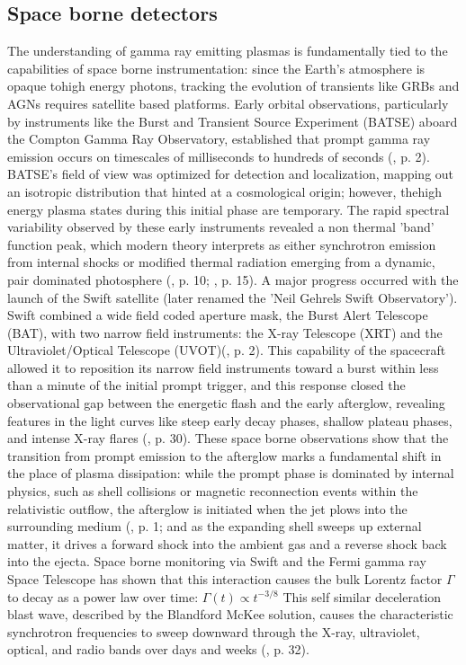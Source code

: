 \documentclass{aa} %
\begin{document}
\subsection{Space borne detectors}
The understanding of gamma ray emitting plasmas is fundamentally tied to the capabilities of space borne instrumentation: since the Earth's atmosphere is opaque tohigh energy photons, tracking the evolution of transients like GRBs and AGNs requires satellite based platforms. 
Early orbital observations, particularly by instruments like the Burst and Transient Source Experiment (BATSE) aboard the Compton Gamma Ray Observatory, established that prompt gamma ray emission occurs on timescales of milliseconds to hundreds of seconds (\citet{KumarandZhang2015}, p. 2). BATSE’s field of view was optimized for detection and localization, mapping out an isotropic distribution that hinted at a cosmological origin; however, thehigh energy plasma states during this initial phase are temporary. The rapid spectral variability observed by these early instruments revealed a non thermal 'band' function peak, which modern theory interprets as either synchrotron emission from internal shocks or modified thermal radiation emerging from a dynamic, pair dominated photosphere (\citet{Peer2019}, p. 10; \citet{KumarandZhang2015}, p. 15).
A major progress occurred with the launch of the Swift satellite (later renamed the 'Neil Gehrels Swift Observatory'). Swift combined a wide field coded aperture mask, the Burst Alert Telescope (BAT), with two narrow field instruments: the X-ray Telescope (XRT) and the Ultraviolet/Optical Telescope (UVOT)(\citet{KumarandZhang2015}, p. 2). This capability of the spacecraft allowed it to reposition its narrow field instruments toward a burst within less than a minute of the initial prompt trigger, and this response closed the observational gap between the energetic flash and the early afterglow, revealing features in the light curves like steep early decay phases, shallow plateau phases, and intense X-ray flares (\citet{KumarandZhang2015}, p. 30).
These space borne observations show that the transition from prompt emission to the afterglow marks a fundamental shift in the place of plasma dissipation: while the prompt phase is dominated by internal physics, such as shell collisions or magnetic reconnection events within the relativistic outflow, the afterglow is initiated when the jet plows into the surrounding medium (\citet{Peer2019}, p. 1; \citep{Brainerd1999} and as the expanding shell sweeps up external matter, it drives a forward shock into the ambient gas and a reverse shock back into the ejecta. 
Space borne monitoring via Swift and the Fermi gamma ray Space Telescope has shown that this interaction causes the bulk Lorentz factor $\Gamma$ to decay as a power law over time:
$\Gamma(t) \propto t^{-3/8}$
This self similar deceleration blast wave, described by the Blandford McKee solution, causes the characteristic synchrotron frequencies to sweep downward through the X-ray, ultraviolet, optical, and radio bands over days and weeks (\citet{KumarandZhang2015}, p. 32).
\end{document}
